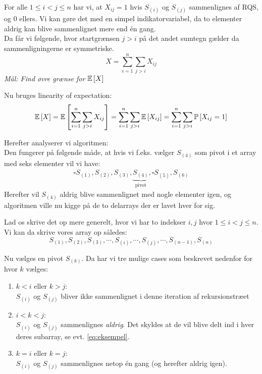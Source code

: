 For alle $1 \leq i < j \leq n$ har vi, at $X_{ij} = 1$ hvis $S_{(i)}$ og $S_{(j)}$ sammenlignes af RQS, og 0 ellers. Vi kan gøre det med en simpel indikatorvariabel, da to elementer aldrig kan blive sammenlignet mere end én gang.\\

Da får vi følgende, hvor startgrænsen $j > i$ på det andet sumtegn gælder da sammenligningerne er symmetriske.
$$
  X = \sum_{i=1}^n \sum_{j>i} X_{ij}
$$
\textit{Mål: Find øvre grænse for $\mathbb{E} \left[  X  \right]$}

Nu bruges linearity of expectation:
\begin{align} \label{eq:exp-X}
  \mathbb{E} \left[  X  \right]
  = \mathbb{E} \left[  \sum_{i=1}^n \sum_{j>i} X_{ij}  \right]
  = \sum_{i=1}^n \sum_{j>i} \mathbb{E} \left[  X_{ij}  \right]
  = \sum_{i=1}^n \sum_{j>i} \mathbb{P} \left[  X_{ij} = 1  \right]
\end{align}

Herefter analyserer vi algoritmen:\\
Den fungerer på følgende måde, at hvis vi f.eks. vælger $S_{(4)}$ som pivot i et array med seks elementer vil vi have:
\begin{align} \label{eq:eksempel}
\square{S_{(1)}, S_{(2)}, S_{(3)},} \underbrace{S_{(4)}}_{\text{pivot}}, \square{ S_{(5)}, S_{(6)}}
\end{align}
Herefter vil $S_{(4)}$ aldrig blive sammenlignet med nogle elementer igen, og algoritmen ville nu kigge på de to delarrays der er lavet hver for sig.

Lad os skrive det op mere generelt, hvor vi har to indekser $i,j$ hvor $1 \leq i < j \leq n$. Vi kan da skrive vores array op således:
$$
S_{(1)}, S_{(2)}, S_{(3)}, \cdots, S_{(i)}, \cdots, S_{(j)}, \cdots, S_{(n-1)}, S_{(n)}
$$

Nu vælges en pivot $S_{(k)}$. Da har vi tre mulige cases som beskrevet nedenfor for hvor $k$ vælges:

\begin{enumerate}
	\item $k < i$ eller $k > j$:\\
	$S_{(i)}$ og $S_{(j)}$ bliver ikke sammenlignet i denne iteration af rekursionstræet
	\item $i < k < j$:\\
	$S_{(i)}$ og $S_{(j)}$ sammenlignes \textit{aldrig}. Det skyldes at de vil blive delt ind i hver deres subarray, se evt. \cref{eq:eksempel}.
	\item $k=i$ eller $k=j$:\\
	$S_{(i)}$ og $S_{(j)}$ sammenlignes netop én gang (og herefter aldrig igen).
\end{enumerate}

